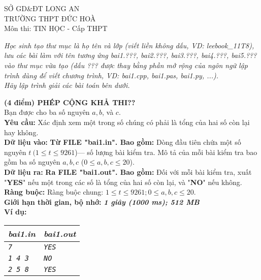 \begin{name}
	{SỞ GD\&ĐT LONG AN \\ TRƯỜNG THPT ĐỨC HOÀ}
	{\testname \\ Môn thi: TIN HỌC - Cấp THPT}
\end{name}

\textit{Học sinh tạo thư mục là họ tên và lớp (viết liền không dấu, VD: leebook\_11T8), lưu các bài làm với tên tương ứng bai1.???, bai2.???, bai3.???, bai4.???, bai5.??? vào thư mục vừa tạo (dấu ??? được thay bằng phần mở rộng của ngôn ngữ lập trình dùng để viết chương trình, VD: bai1.cpp, bai1.pas, bai1.py, ...).\\
	Hãy lập trình giải các bài toán bên dưới.}


\begin{ex}
	\textbf{(4 điểm) PHÉP CỘNG KHẢ THI??}\\
	Bạn được cho ba số nguyên $a, b$, và $c$. \\
	\textbf{Yêu cầu: }Xác định xem một trong số chúng có phải là tổng của hai số còn lại hay không.\\
	\textbf{Dữ liệu vào: }\textbf{Từ FILE "bai1.in". Bao gồm: }Dòng đầu tiên chứa một số nguyên $t ~(1 \leq t \leq 9261$)— số lượng bài kiểm tra. Mô tả của mỗi bài kiểm tra bao gồm ba số nguyên $a, b, c$ ($0 \leq a, b, c \leq 20$).\\
	\textbf{Dữ liệu ra: }\textbf{Ra FILE "bai1.out". Bao gồm: }Đối với mỗi bài kiểm tra, xuất "\textbf{YES}" nếu một trong các số là tổng của hai số còn lại, và "\textbf{NO}" nếu không.\\
	\textbf{Ràng buộc: } Ràng buộc chung: $1 \leq t \leq 9261; 0 \leq a,b,c \leq 20$.\\
	\textbf{Giới hạn thời gian, bộ nhớ: } \textbf{\textit{1 giây (1000 ms); 512 MB}} \\
	\textbf{Ví dụ: }
	\begin{center}
		\begin{tabular}{|l|l|}
			\hline
			\textit{\textbf{\textsf{bai1.in}}} & \textit{\textbf{\textsf{bai1.out}}} \\ %
			\hline
			\textit{\texttt{7}}                & \textit{\texttt{YES}}               \\ %
			\textit{\texttt{1 4 3}}            & \textit{\texttt{NO}}                \\ %
			\textit{\texttt{2 5 8}}            & \textit{\texttt{YES}}               \\ %

\end{tabular}
\end{center}
\end{ex}
